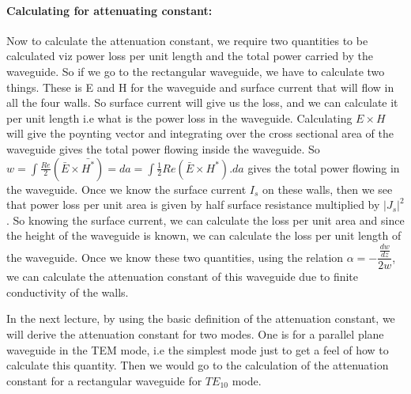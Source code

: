 \paragraph{Calculating for attenuating constant:}
Now to calculate the attenuation constant, we require two quantities to be calculated viz power loss per unit length and the total power carried by the waveguide. So if we go to the rectangular waveguide, we have to calculate two things. These is E and H for the waveguide and surface current that will flow in all the four walls. So surface current will give us the loss, and we can calculate it per unit length i.e what is the power loss in the waveguide. Calculating $E\times H$ will give the poynting vector and integrating over the cross sectional  area of the waveguide gives the total power flowing inside the waveguide. So $w = \int\frac{Re}{2}(\bar{E}\times\bar{H^*})={da} = \int \frac{1}{2}Re(\bar{E}\times {H}^*).{da}$ gives the total power flowing in  the waveguide. Once we know the surface current $I_{s}$ on these walls, then we see that power loss per unit area is given by half surface resistance multiplied by $|J_{s}|^{2}$. So knowing the surface current, we can calculate the loss per unit area and since the height of the waveguide is known, we can calculate the loss per unit length of the waveguide. Once we know these two quantities, using the relation $\alpha = -\dfrac{\frac{dw}{dz}}{2w}$, we can calculate the attenuation constant of this waveguide due to finite conductivity of the walls.

In the next lecture, by using the basic definition of the attenuation constant, we will derive the attenuation constant for two modes. One is for a parallel plane waveguide in the TEM mode, i.e the simplest mode just to get a feel of how to calculate this quantity. Then we would go to the calculation of the attenuation constant for a rectangular waveguide for $TE_{10}$ mode. 